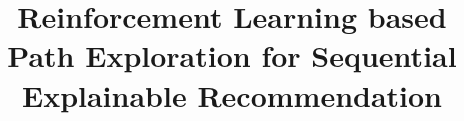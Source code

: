 \documentclass[10pt,journal,compsoc, twocolumn]{IEEEtran}
\begin{document}
%
\title{Reinforcement Learning based Path Exploration for Sequential Explainable Recommendation}
%
%
%
%





\end{document}
